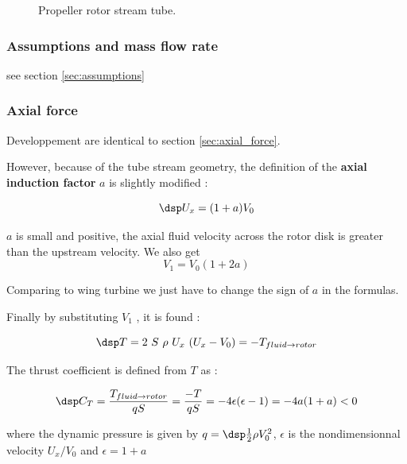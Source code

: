 \begin{figure}[htb]
  \begin{center}
  
  \caption{Propeller rotor stream tube.}
  \label{fig:config_propeller}
  \end{center}
\end{figure}


\subsubsection{\sc Assumptions and mass flow rate }

see section \ref{sec:assumptions}



\subsubsection{\sc Axial force}
Developpement are identical to section \ref{sec:axial_force}.

However, because of the tube stream geometry, the definition of the
\textbf{axial induction factor} $a$ is slightly modified :

\begin{equation} \dsp 
U_x = (1+a) V_0
\label{eq:def_a_0_prop}
\end{equation}

$a$ is small and positive, the axial fluid velocity across the rotor  disk is greater than the upstream velocity.
We also  get $$V_1 = V_0 (1+2 a)$$

Comparing to wing turbine we just have to change the sign of $a$ in the formulas.

Finally by substituting $V_1$ , it is found :

\begin{equation} \dsp 
T =  2~S~\rho~U_x~(U_x-V_0) = - T_{fluid\to rotor}
\end{equation}


The thrust coefficient is defined from $T$ as :

$$
\dsp
C_T = \frac{T_{fluid\to rotor}}{q S} = \frac{-T}{q S} = - 4 \epsilon (\epsilon -1) = - 4 a (1+ a) < 0
$$



where the dynamic pressure is given by $q =\dsp \frac{1}{2} \rho V_0^2$, 
$\epsilon$ is  the nondimensionnal velocity $U_x/V_0$ and $\epsilon = 1 + a$



